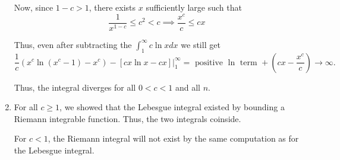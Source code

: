 \documentclass[12pt]{Homework}
\begin{document}
\begin{solution}
\begin{enumerate}[label=(\alph*)]
Now, since $1-c>1$, there exists $x$ sufficiently large such that $$\frac{1}{x^{1-c}}\le c^2<c\implies \frac{x^c}{c}\le cx$$ 

Thus, even after subtracting the $\int_1^\infty c\ln xdx$ we still get 
$$\frac{1}{c}(x^c\ln(x^c-1)-x^c)-[cx\ln x-cx]\bigg|_1^\infty=\text{ positive }\ln\text{ term }+(cx-\frac{x^c}{c})\to\infty.$$

Thus, the integral diverges for all $0<c<1$ and all $n$.


    
\begin{comment}
    Pick $m$ to be the smallest even integer such that $\frac{1}{m}\le c$. Then $x^{1/m}\le x^c$ and so $\frac{1}{x^{1/m}}\ge\frac{1}{x^c}$ for all $x\ge1$. Then $$\ln\left(1-\frac{1}{x^c}\right)\ge\ln\left(1-\frac{1}{x^{1/m}}\right)$$ so \begin{align*}
        \int_1^\infty\ln\left(1+\frac{(\sin x)^n}{x^c}\right)dx&\ge\int_1^\infty\ln\left(\frac{x^{1/m}-1}{x^{1/m}}\right)dx\\
        &=\int_1^\infty\ln(x^{1/m}-1)-\frac{1}{m}\ln xdx\\
    \end{align*}
    
    Now, \begin{align*}
        \int_1^\infty\ln(x^{1/m}-1)dx&=\int_1^\infty\frac{mx^{1/m-1}}{mx^{1/m-1}}\ln(x^{1/m}-1)dx\\
        &=\int_1^\infty mu^{m-1}\ln(u-1)du\qquad \begin{matrix}
    u=x^{1/m} &  u^m=x\\
    du=\frac{1}{m}x^{1/m}dx & 
\end{matrix}\\
        &=u^m\ln(u-1)-\int\frac{u^m}{u-1}du\qquad\begin{matrix}
    w=ln(u-1) &  dv=mu^{m-1}\\
    dw=\frac{1}{u-1}dx & v=u^m
\end{matrix}\\
        &=u^m\ln(u-1)-\int u^{m-1}+u^{m-2}\cdots+1+\frac{1}{u-1}du\\
        &=u^m\ln(u-1)-\frac{u^m}{m}-\cdots-u-\ln(u-1)\\
        &=x\ln(x^{1/m}-1)-\frac{x}{m}-\cdots-x^{1/m}-\ln(x^{1/m}-1)
    \end{align*}
    Finally, even after subtracting the $\int\frac{1}{m}\ln xdx$, we still have at least an $\ln(x^{1/m}-1)$ term which diverges as $x\to\infty$.
    
    Thus, the integral does not exist for all $0<c<1$ and all $n$.
\end{comment}
    \item For all $c\ge1$, we showed that the Lebesgue integral existed by bounding a Riemann integrable function. Thus, the two integrals coinside. 
    
    For $c< 1$, the Riemann integral will not exist by the same computation as for the Lebesgue integral. 
\end{enumerate}
\end{solution}
\newpage
\end{document}
